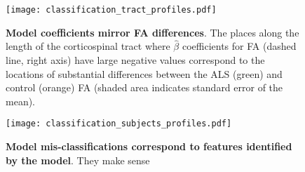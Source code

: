 \begin{figure}[!h]
    \centering
    \texttt{[image: classification\_tract\_profiles.pdf]}
    \caption{{\bf Model coefficients mirror FA differences}. The places along the
       length of the corticospinal tract where $\hat{\beta}$ coefficients for FA
       (dashed line, right axis) have large negative values correspond to the
       locations of substantial differences between the ALS (green) and control
       (orange) FA (shaded area indicates standard error of the mean).}
    \label{fig:class-profiles}
\end{figure}


\begin{figure}[!h]
    \centering
        \texttt{[image: classification\_subjects\_profiles.pdf]}
    \caption{{\bf Model mis-classifications correspond to features identified by the model}.
       They make sense}
    \label{fig:class-errors}
\end{figure}
